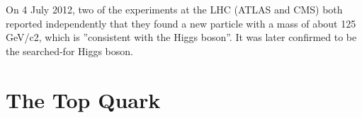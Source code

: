 On 4 July 2012, two of the experiments at the LHC (ATLAS and CMS) both reported independently that they found a new particle with a mass of about 125 GeV/c2, which is ''consistent with the Higgs boson''. It was later confirmed to be the searched-for Higgs boson.

\section{The Top Quark}
\label{sec:theory_top}
